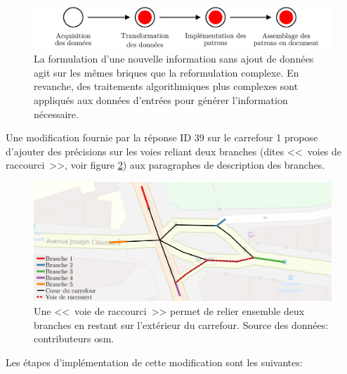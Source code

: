 \begin{figure}[ht]
    \centering
    \includegraphics[width=\textwidth]{images/evaluation/pipeline/pipeline_reformulation_complexe.pdf}
    \caption[Formulation d'une nouvelle information sans ajout de données dans la chaîne de description]{La formulation d'une nouvelle information sans ajout de données agit sur les mêmes briques que la reformulation complexe. En revanche, des traitements algorithmiques plus complexes sont appliqués aux données d'entrées pour générer l'information nécessaire.}
    \label{fig:evaluation_nouvelle_information_sans_ajout}
\end{figure}

\newpar{}

Une modification fournie par la réponse ID 39 sur le carrefour 1 propose d'ajouter des précisions sur les voies reliant deux branches (dites <<~voies de raccourci~>>, voir figure \ref{fig:evaluation_voie_de_raccourci}) aux paragraphes de description des branches.

\begin{figure}[ht]
    \centering
    \includegraphics[width=\textwidth]{images/evaluation/pipeline/voie_raccourci.pdf}
    \caption[Une <<~voie de raccourci~>> dans un carrefour]{Une <<~voie de raccourci~>> permet de relier ensemble deux branches en restant sur l'extérieur du carrefour. Source des données: contributeurs \gls{osm}.}
    \label{fig:evaluation_voie_de_raccourci}
\end{figure}

\newpar{}

Les étapes d'implémentation de cette modification sont les suivantes:

